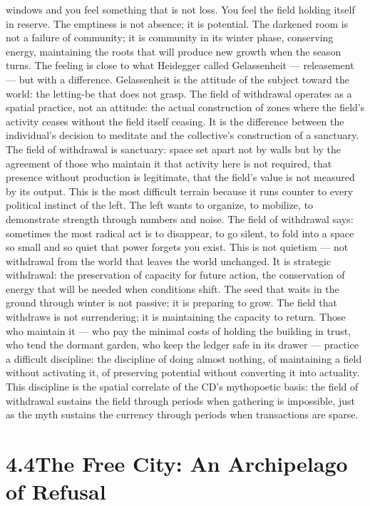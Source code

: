 windows and you feel something that is not loss. You feel the field holding itself in reserve. The emptiness is not absence; it is potential. The darkened room is not a failure of community; it is community in its winter phase, conserving energy, maintaining the roots that will produce new growth when the season turns. The feeling is close to what Heidegger called Gelassenheit — releasement — but with a difference. Gelassenheit is the attitude of the subject toward the world: the letting-be that does not grasp. The field of withdrawal operates as a spatial practice, not an attitude: the actual construction of zones where the field’s activity ceases without the field itself ceasing. It is the difference between the individual’s decision to meditate and the collective’s construction of a sanctuary. The field of withdrawal is sanctuary: space set apart not by walls but by the agreement of those who maintain it that activity here is not required, that presence without production is legitimate, that the field’s value is not measured by its output. This is the most difficult terrain because it runs counter to every political instinct of the left. The left wants to organize, to mobilize, to demonstrate strength through numbers and noise. The field of withdrawal says: sometimes the most radical act is to disappear, to go silent, to fold into a space so small and so quiet that power forgets you exist. This is not quietism — not withdrawal from the world that leaves the world unchanged. It is strategic withdrawal: the preservation of capacity for future action, the conservation of energy that will be needed when conditions shift. The seed that waits in the ground through winter is not passive; it is preparing to grow. The field that withdraws is not surrendering; it is maintaining the capacity to return. Those who maintain it — who pay the minimal costs of holding the building in trust, who tend the dormant garden, who keep the ledger safe in its drawer — practice a difficult discipline: the discipline of doing almost nothing, of maintaining a field without activating it, of preserving potential without converting it into actuality. This discipline is the spatial correlate of the CD’s mythopoetic basis: the field of withdrawal sustains the field through periods when gathering is impossible, just as the myth sustains the currency through periods when transactions are sparse.

\section{4.4\quad The Free City: An Archipelago of Refusal}

